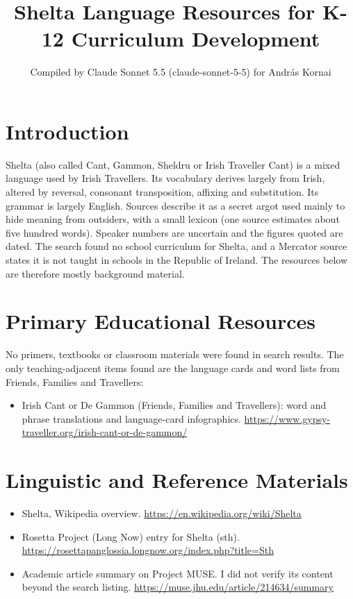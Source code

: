 \documentclass[12pt]{article}
\title{Shelta Language Resources for K-12 Curriculum Development}
\author{Compiled by Claude Sonnet 5.5 (claude-sonnet-5-5) for Andr\'as Kornai}
\date{}
\begin{document}
\maketitle

\section{Introduction}
Shelta (also called Cant, Gammon, Sheldru or Irish Traveller Cant) is a mixed language used by Irish Travellers. Its vocabulary derives largely from Irish, altered by reversal, consonant transposition, affixing and substitution. Its grammar is largely English. Sources describe it as a secret argot used mainly to hide meaning from outsiders, with a small lexicon (one source estimates about five hundred words). Speaker numbers are uncertain and the figures quoted are dated. The search found no school curriculum for Shelta, and a Mercator source states it is not taught in schools in the Republic of Ireland. The resources below are therefore mostly background material.

\section{Primary Educational Resources}
No primers, textbooks or classroom materials were found in search results. The only teaching-adjacent items found are the language cards and word lists from Friends, Families and Travellers:
\begin{itemize}
\item Irish Cant or De Gammon (Friends, Families and Travellers): word and phrase translations and language-card infographics. \url{https://www.gypsy-traveller.org/irish-cant-or-de-gammon/}
\end{itemize}

\section{Linguistic and Reference Materials}
\begin{itemize}
\item Shelta, Wikipedia overview. \url{https://en.wikipedia.org/wiki/Shelta}
\item Rosetta Project (Long Now) entry for Shelta (sth). \url{https://rosettapanglossia.longnow.org/index.php?title=Sth}
\item Academic article summary on Project MUSE. I did not verify its content beyond the search listing. \url{https://muse.jhu.edu/article/214634/summary}
\end{itemize}
\end{document}
